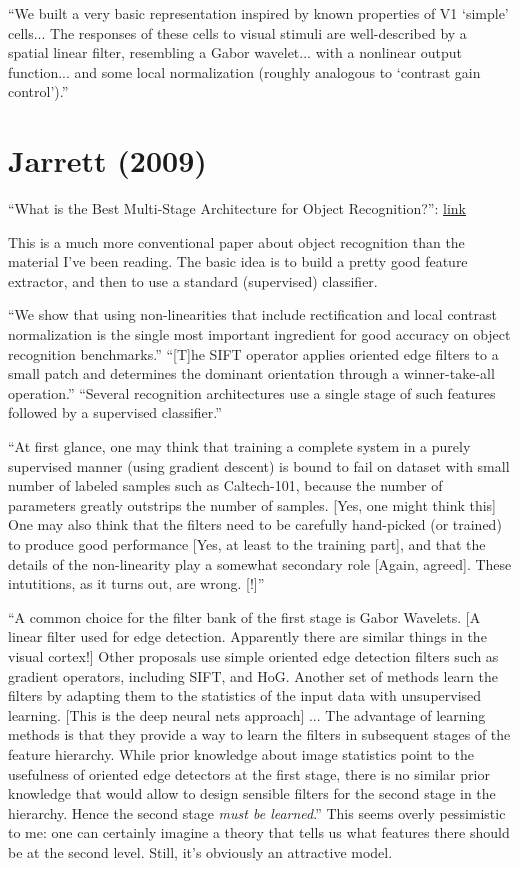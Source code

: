 \documentclass[12pt]{report}
\newcommand{\link}[2]{\href{#1}{#2}}
\begin{document}
``We built a very basic representation inspired by known properties of
V1 `simple' cells... The responses of these cells to visual stimuli
are well-described by a spatial linear filter, resembling a Gabor
wavelet... with a nonlinear output function... and some local
normalization (roughly analogous to `contrast gain control').''


\section{Jarrett (2009)}

``What is the Best Multi-Stage Architecture for Object Recognition?'':
\link{http://yann.lecun.com/exdb/publis/pdf/jarrett-iccv-09.pdf}{link}

This is a much more conventional paper about object recognition than
the material I've been reading.  The basic idea is to build a pretty
good feature extractor, and then to use a standard (supervised)
classifier.

``We show that using non-linearities that include rectification and
local contrast normalization is the single most important ingredient
for good accuracy on object recognition benchmarks.''  ``[T]he SIFT
operator applies oriented edge filters to a small patch and determines
the dominant orientation through a winner-take-all operation.''
``Several recognition architectures use a single stage of such
features followed by a supervised classifier.''

``At first glance, one may think that training a complete system in a
purely supervised manner (using gradient descent) is bound to fail on
dataset with small number of labeled samples such as Caltech-101,
because the number of parameters greatly outstrips the number of
samples.  [Yes, one might think this] One may also think that the
filters need to be carefully hand-picked (or trained) to produce good
performance [Yes, at least to the training part], and that the details
of the non-linearity play a somewhat secondary role [Again, agreed].
These intutitions, as it turns out, are wrong. [!]''

``A common choice for the filter bank of the first stage is Gabor
Wavelets.  [A linear filter used for edge detection.  Apparently there
are similar things in the visual cortex!] Other proposals use simple
oriented edge detection filters such as gradient operators, including
SIFT, and HoG.  Another set of methods learn the filters by adapting
them to the statistics of the input data with unsupervised
learning. [This is the deep neural nets approach] ... The advantage of
learning methods is that they provide a way to learn the filters in
subsequent stages of the feature hierarchy.  While prior knowledge
about image statistics point to the usefulness of oriented edge
detectors at the first stage, there is no similar prior knowledge that
would allow to design sensible filters for the second stage in the
hierarchy.  Hence the second stage \emph{must be learned}.''  This
seems overly pessimistic to me: one can certainly imagine a theory
that tells us what features there should be at the second level.
Still, it's obviously an attractive model.
\end{document}
